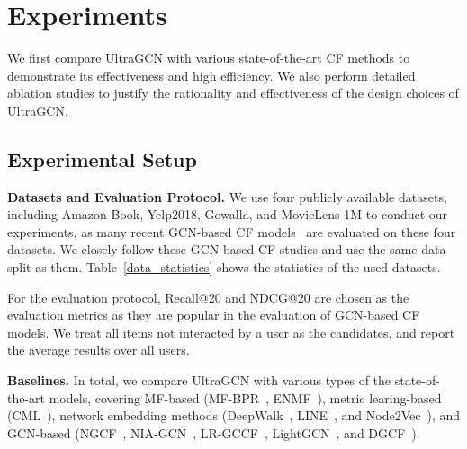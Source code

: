 \documentclass[sigconf,authorversion]{acmart}
\begin{document}
 \section{Experiments}
We first compare UltraGCN with various state-of-the-art CF methods to demonstrate its effectiveness and high efficiency. We also perform detailed ablation studies to justify the rationality and effectiveness of the design choices of UltraGCN. 

\subsection{Experimental Setup}

\textbf{Datasets and Evaluation Protocol.} 
We use four publicly available datasets, including Amazon-Book, Yelp2018, Gowalla, and MovieLens-1M to conduct our experiments, as many recent GCN-based CF models~\cite{NGCF,LightGCN,DGCF, LCFN} are evaluated on these four datasets. 
 We closely follow these GCN-based CF studies and use the same data split as them. 
Table~\ref{data_statistics} shows the statistics of the used datasets.  

For the evaluation protocol, Recall@20 and NDCG@20 are chosen as the evaluation metrics as they are popular in the evaluation of GCN-based CF models. We treat all items not interacted by a user as the candidates, and report  
the average results over all users.









\begin{table}[!t]
\centering
\caption{Statistics of the datasets.}
\label{data_statistics}
\end{table}

\textbf{Baselines.} 
In total, we compare UltraGCN with various types of the state-of-the-art models, covering MF-based (MF-BPR~\cite{MF}, ENMF~\cite{ENMF}), metric learing-based (CML~\cite{CML}), network embedding methods (DeepWalk~\cite{deepwalk}, LINE~\cite{LINE}, and Node2Vec~\cite{node2vec}), and GCN-based (NGCF~\cite{NGCF}, NIA-GCN~\cite{NIA-GCN}, LR-GCCF~\cite{LR-GCCF}, LightGCN~\cite{LightGCN}, and DGCF~\cite{DGCF}).
\end{document}
